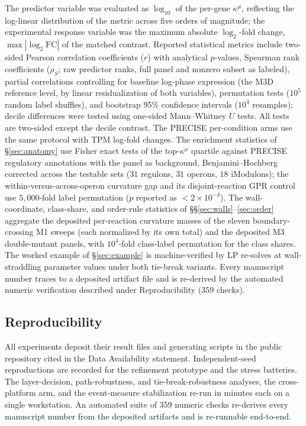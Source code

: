 \documentclass[11pt,a4paper]{article}
\theoremstyle{plain}
\theoremstyle{definition}
\theoremstyle{remark}
\newcommand{\kmu}{\kappa^{\mu}}
\begin{document}
The predictor variable was evaluated as $\log_{10}$ of the per-gene
$\kmu$, reflecting the log-linear distribution of the metric across
five orders of magnitude; the experimental response variable was the
maximum absolute $\log_2$-fold change, $\max|\log_2 \mathrm{FC}|$ of
the matched contrast. Reported statistical metrics include two-sided
Pearson correlation coefficients ($r$) with analytical $p$-values,
Spearman rank coefficients ($\rho_S$; raw predictor ranks, full
panel and nonzero subset as labeled), partial correlations
controlling for baseline log-phase expression (the M3D reference
level, by linear residualization of both variables), permutation
tests ($10^5$ random label shuffles), and bootstrap 95\% confidence
intervals ($10^4$ resamples); decile differences were tested using
one-sided Mann--Whitney $U$ tests. All tests are two-sided except
the decile contrast. The PRECISE per-condition arms use the same
protocol with TPM log-fold changes. The enrichment statistics of
\S\ref{sec:anatomy} use Fisher exact tests of the top-$\kmu$
quartile against PRECISE regulatory annotations with the panel as
background, Benjamini--Hochberg corrected across the testable sets
($31$ regulons, $31$ operons, $18$ iModulons); the
within-versus-across-operon curvature gap and its disjoint-reaction
GPR control use $5{,}000$-fold label permutation ($p$ reported as
$< 2 \times 10^{-4}$). The wall-coordinate, class-share, and
order-rule statistics of \S\S\ref{sec:walls}--\ref{sec:order}
aggregate the deposited per-reaction curvature masses of the eleven
boundary-crossing M1 sweeps (each normalized by its own total) and
the deposited M3 double-mutant panels, with $10^4$-fold class-label
permutation for the class shares. The worked example of
\S\ref{sec:example} is machine-verified by LP re-solves at
wall-straddling parameter values under both tie-break variants.
Every manuscript number traces
to a deposited artifact file and is re-derived by the automated
numeric verification described under Reproducibility
($359$ checks).

\subsection{Reproducibility}

All experiments deposit their result files and generating
scripts in the public repository cited in the Data Availability
statement. Independent-seed reproductions are recorded for the
refinement prototype and the stress batteries. The layer-decision,
path-robustness, and tie-break-robustness analyses, the cross-platform
arm, and the event-measure stabilization re-run in minutes each on a
single workstation. An automated suite of $359$ numeric checks
re-derives every manuscript number from the deposited artifacts and
is re-runnable end-to-end.
\end{document}
